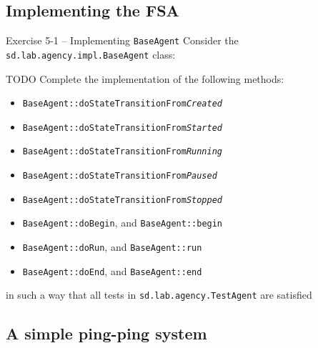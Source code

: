 \documentclass[presentation]{beamer}\mode<presentation>{\usetheme{AMSCesenaPurpleAndGold}}
\begin{document}
\subsection{Implementing the FSA}

\begin{frame}[allowframebreaks]{Exercise 5-1 -- Implementing \texttt{BaseAgent}}
    Consider the \texttt{sd.lab.agency.impl.\alert{BaseAgent}} class:
    
    
    \framebreak
    
    \begin{block}{TODO}
        Complete the implementation of the following methods:
        \begin{itemize}
            \item \texttt{BaseAgent::\alert{doStateTransitionFrom\textit{Created}}}
            
            \item \texttt{BaseAgent::\alert{doStateTransitionFrom\textit{Started}}}
            
            \item \texttt{BaseAgent::\alert{doStateTransitionFrom\textit{Running}}}
            
            \item \texttt{BaseAgent::\alert{doStateTransitionFrom\textit{Paused}}}
            
            \item \texttt{BaseAgent::\alert{doStateTransitionFrom\textit{Stopped}}} 
            
            \item \texttt{BaseAgent::\alert{doBegin}}, and  \texttt{BaseAgent::\alert{begin}}
            
            \item \texttt{BaseAgent::\alert{doRun}}, and \texttt{BaseAgent::\alert{run}}
            
            \item \texttt{BaseAgent::\alert{doEnd}}, and \texttt{BaseAgent::\alert{end}}
        \end{itemize}
        in such a way that all tests in \texttt{sd.lab.agency.\alert{TestAgent}} are satisfied
    \end{block}
\end{frame}

\subsection{A simple ping-ping system}
\end{document}

